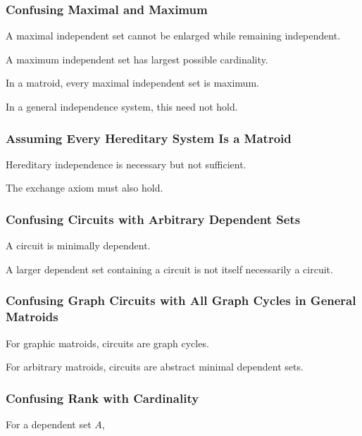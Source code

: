 \subsubsection{Confusing Maximal and Maximum}

A maximal independent set cannot be enlarged while remaining
independent.

A maximum independent set has largest possible cardinality.

In a matroid, every maximal independent set is maximum.

In a general independence system, this need not hold.

\subsubsection{Assuming Every Hereditary System Is a Matroid}

Hereditary independence is necessary but not sufficient.

The exchange axiom must also hold.

\subsubsection{Confusing Circuits with Arbitrary Dependent Sets}

A circuit is minimally dependent.

A larger dependent set containing a circuit is not itself necessarily a
circuit.

\subsubsection{Confusing Graph Circuits with All Graph Cycles in General Matroids}

For graphic matroids, circuits are graph cycles.

For arbitrary matroids, circuits are abstract minimal dependent sets.

\subsubsection{Confusing Rank with Cardinality}

For a dependent set \(A\),

